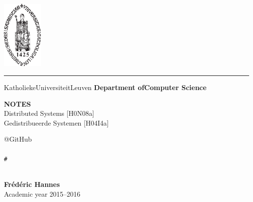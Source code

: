 \documentclass[a4paper]{article}
\begin{document}
\begin{titlepage}
    \newpage
    \thispagestyle{empty}
    \frenchspacing
    \hspace{-0.2cm}
    \includegraphics[height=3.4cm]{assets/sedes}
    \hspace{0.2cm}
    \rule{0.5pt}{3.4cm}
    \hspace{0.2cm}
    \begin{minipage}[b]{8cm}
        \large{Katholieke\newline Universiteit\newline Leuven}\smallskip\newline
        \large{}\smallskip\newline
        \textbf{Department of\newline Computer Science}\smallskip
    \end{minipage}
    \vspace*{3.2cm}\vfill
    \begin{center}
        \begin{minipage}[t]{\textwidth}
            \begin{center}
                \large{\rm{\textbf{\uppercase{Notes}}}}\\
                \large{\rm{Distributed Systems [H0N08a]}}\\
                \large{\rm{Gedistribueerde Systemen [H04I4a]}}
            \end{center}
        \end{minipage}
    \end{center}
    \vfill\vspace*{5cm}
    \begin{minipage}[t]{0.2\textwidth}
        \begin{center}
            @GitHub\\
            \\
            {\tt \#}
        \end{center}
    \end{minipage}\hfill
    \begin{minipage}[t]{0.3\textwidth}
        \vfill\noindent \\[5mm]
        {\rm \textbf{Fr\'ed\'eric Hannes}}\\[2mm]
        {\rm Academic year 2015--2016}
    \end{minipage}
\end{titlepage}
\end{document}
